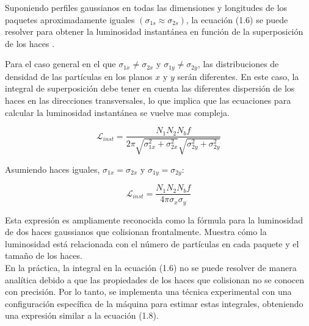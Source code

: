 

Suponiendo perfiles gaussianos en todas las dimensiones y longitudes de los paquetes aproximadamente iguales $(\sigma_{1s}\approx \sigma_{2s})$, la ecuación (1.6) se puede resolver para obtener la luminosidad instantánea en función de la superposición de los haces \cite{concept_of_luminosity}.

Para el caso general en el que $\sigma_{1x}\neq \sigma_{2x}$ y $\sigma_{1y}\neq \sigma_{2y}$, las distribuciones de densidad de las partículas en los planos $x$ y $y$ serán diferentes. En este caso, la integral de superposición debe tener en cuenta las diferentes dispersión de los haces en las direcciones transversales, lo que implica que las ecuaciones para calcular la luminosidad instantánea se vuelve mas compleja.


\begin{equation}
  \mathcal{L}_{inst}= \frac{N_{1} N_{2} N_{b}f }{2\pi \sqrt{\sigma_{1x}^{2}+\sigma_{2x}^{2}}\sqrt{\sigma_{2y}^{2}+\sigma_{2y}^{2}}}
  \label{lumi_general}
\end{equation}

Asumiendo haces iguales, $\sigma_{1x}= \sigma_{2x} \text{ y } \sigma_{1y}= \sigma_{2y}$:

\begin{equation}
  \mathcal{L}_{inst}= \frac{N_{1} N_{2} N_{b}f }{4\pi \sigma_{x} \sigma_{y}}
  \label{lumi_theor}
\end{equation}

Esta expresión es ampliamente reconocida como la fórmula para la luminosidad de dos haces gaussianos que colisionan frontalmente. Muestra cómo la luminosidad está relacionada con el número de partículas en cada paquete y el tamaño de los haces.\\

En la práctica, la integral en la ecuación (1.6) no se puede resolver de manera analítica debido a que las propiedades de los haces que colisionan no se conocen con precisión. Por lo tanto, se implementa una técnica experimental con una configuración específica de la máquina para estimar estas integrales, obteniendo una expresión similar a la ecuación (1.8).


